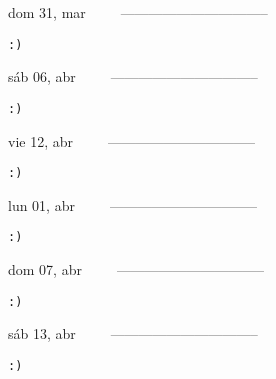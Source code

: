 \documentclass[letterpaper,10pt]{article}
\begin{document}
\begin{multicols}{3}
{dom 31, mar\ \ \ \ \ --------------------------------}
\begin{flushright}\begin{small}\texttt{:)}\end{small}\end{flushright}
\vfill
{sáb 06, abr\ \ \ \ \ --------------------------------}
\begin{flushright}\begin{small}\texttt{:)}\end{small}\end{flushright}\par
\vfill
{vie 12, abr\ \ \ \ \ --------------------------------}
\begin{flushright}\begin{small}\texttt{:)}\end{small}\end{flushright}\par
\vfill
\end{multicols}
\vspace{1.05cm}

\begin{multicols}{3}
{lun 01, abr\ \ \ \ \ --------------------------------}
\begin{flushright}\begin{small}\texttt{:)}\end{small}\end{flushright}
\vfill
{dom 07, abr\ \ \ \ \ --------------------------------}
\begin{flushright}\begin{small}\texttt{:)}\end{small}\end{flushright}\par
\vfill
{sáb 13, abr\ \ \ \ \ --------------------------------}
\begin{flushright}\begin{small}\texttt{:)}\end{small}\end{flushright}\par
\vfill
\end{multicols}
\vspace{1.05cm}
\end{document}
